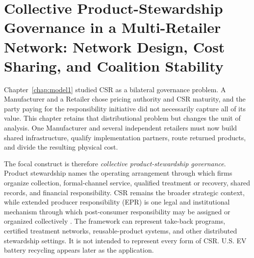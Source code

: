 \chapter[Collective Product-Stewardship Governance]{Collective Product-Stewardship Governance in a Multi-Retailer Network: Network Design, Cost Sharing, and Coalition Stability}
\label{chap:model2}

Chapter~\ref{chap:model1} studied CSR as a bilateral governance problem. A Manufacturer and a Retailer chose pricing authority and CSR maturity, and the party paying for the responsibility initiative did not necessarily capture all of its value. This chapter retains that distributional problem but changes the unit of analysis. One Manufacturer and several independent retailers must now build shared infrastructure, qualify implementation partners, route returned products, and divide the resulting physical cost.

The focal construct is therefore \emph{collective product-stewardship governance}. Product stewardship names the operating arrangement through which firms organize collection, formal-channel service, qualified treatment or recovery, shared records, and financial responsibility. CSR remains the broader strategic context, while extended producer responsibility (EPR) is one legal and institutional mechanism through which post-consumer responsibility may be assigned or organized collectively \cite{AtasuSubramanian2012,FleckingerGlachant2010,OECD2016EPR,EUWasteFrameworkDirective}. The framework can represent take-back programs, certified treatment networks, reusable-product systems, and other distributed stewardship settings. It is not intended to represent every form of CSR. U.S. EV battery recycling appears later as the application.

\begin{table}[htbp]
\centering
\caption{Continuity from Chapter 3 to Chapter 4}
\label{tab:ch3_ch4_bridge}
\end{table}

